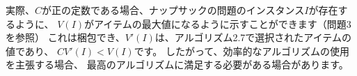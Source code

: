 
実際、$C$が正の定数である場合、ナップサックの問題のインスタンス$I$が存在するように、
$V(I)$がアイテムの最大値になるように示すことができます（問題3を参照） 
これは梱包でき、$ V'(I)$は、アルゴリズム2.7で選択されたアイテムの値であり、
$CV'(I)<V(I)$です。 したがって、効率的なアルゴリズムの使用を主張する場合、
最高のアルゴリズムに満足する必要がある場合があります。